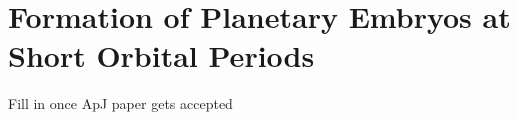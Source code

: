 \chapter {Formation of Planetary Embryos at Short Orbital Periods}

Fill in once ApJ paper gets accepted
